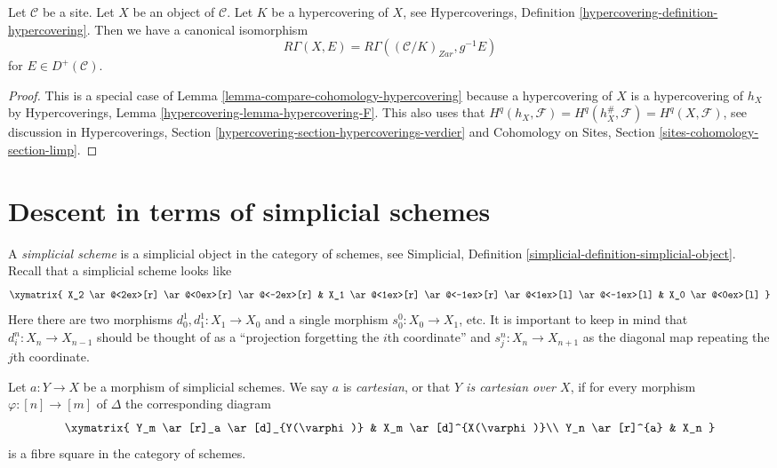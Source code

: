 \begin{lemma}
\label{lemma-compare-cohomology-hypercovering-X}
Let $\mathcal{C}$ be a site. Let $X$ be an object of $\mathcal{C}$.
Let $K$ be a hypercovering of $X$, see Hypercoverings, Definition
\ref{hypercovering-definition-hypercovering}.
Then we have a canonical isomorphism
$$
R\Gamma(X, E) =
R\Gamma((\mathcal{C}/K)_{Zar}, g^{-1}E)
$$
for $E \in D^+(\mathcal{C})$.
\end{lemma}

\begin{proof}
This is a special case of Lemma \ref{lemma-compare-cohomology-hypercovering}
because a hypercovering of $X$ is a hypercovering of $h_X$ by
Hypercoverings, Lemma \ref{hypercovering-lemma-hypercovering-F}.
This also uses that
$H^q(h_X, \mathcal{F}) = H^q(h_X^\#, \mathcal{F}) = H^q(X, \mathcal{F})$,
see discussion in
Hypercoverings, Section \ref{hypercovering-section-hypercoverings-verdier}
and
Cohomology on Sites, Section \ref{sites-cohomology-section-limp}.
\end{proof}








\section{Descent in terms of simplicial schemes}
\label{section-simplicial}

\noindent
A {\it simplicial scheme} is a simplicial object in the category of schemes,
see Simplicial, Definition \ref{simplicial-definition-simplicial-object}.
Recall that a simplicial scheme looks like
$$
\xymatrix{
X_2
\ar@<2ex>[r]
\ar@<0ex>[r]
\ar@<-2ex>[r]
&
X_1
\ar@<1ex>[r]
\ar@<-1ex>[r]
\ar@<1ex>[l]
\ar@<-1ex>[l]
&
X_0
\ar@<0ex>[l]
}
$$
Here there are two morphisms $d^1_0, d^1_1 : X_1 \to X_0$
and a single morphism $s^0_0 : X_0 \to X_1$, etc.
It is important to keep in mind that $d^n_i : X_n \to X_{n - 1}$
should be thought of as a ``projection forgetting the
$i$th coordinate'' and $s^n_j : X_n \to X_{n + 1}$ as the diagonal
map repeating the $j$th coordinate.

\begin{definition}
\label{definition-cartesian-morphism}
Let $a : Y \to X$ be a morphism of simplicial schemes.
We say $a$ is {\it cartesian}, or that {\it $Y$ is cartesian over $X$},
if for every morphism $\varphi : [n] \to [m]$ of $\Delta$ the corresponding
diagram
$$
\xymatrix{
Y_m \ar[r]_a \ar[d]_{Y(\varphi)} & X_m \ar[d]^{X(\varphi)}\\
Y_n \ar[r]^{a} & X_n
}
$$
is a fibre square in the category of schemes.
\end{definition}

